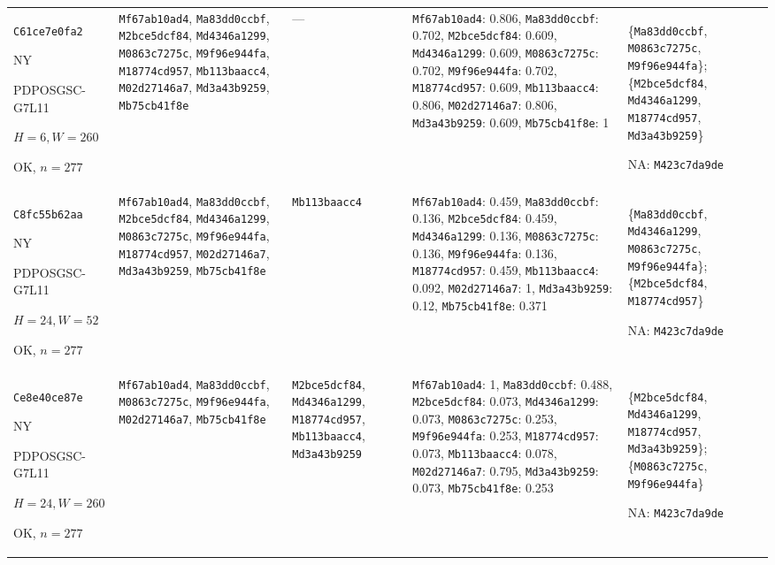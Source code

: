 \begin{longtable}{p{.15\linewidth}p{.17\linewidth}p{.17\linewidth}p{.25\linewidth}p{.14\linewidth}}
\texttt{C61ce7e0fa2}\par NY\par PDPOSGSC-\allowbreak{}G7L11\par $H=6,W=260$\par OK, $n=277$ & \texttt{Mf67ab10ad4}, \texttt{Ma83dd0ccbf}, \texttt{M2bce5dcf84}, \texttt{Md4346a1299}, \texttt{M0863c7275c}, \texttt{M9f96e944fa}, \texttt{M18774cd957}, \texttt{Mb113baacc4}, \texttt{M02d27146a7}, \texttt{Md3a43b9259}, \texttt{Mb75cb41f8e} & --- & \texttt{Mf67ab10ad4}: 0.806, \texttt{Ma83dd0ccbf}: 0.702, \texttt{M2bce5dcf84}: 0.609, \texttt{Md4346a1299}: 0.609, \texttt{M0863c7275c}: 0.702, \texttt{M9f96e944fa}: 0.702, \texttt{M18774cd957}: 0.609, \texttt{Mb113baacc4}: 0.806, \texttt{M02d27146a7}: 0.806, \texttt{Md3a43b9259}: 0.609, \texttt{Mb75cb41f8e}: 1 & \{\texttt{Ma83dd0ccbf}, \texttt{M0863c7275c}, \texttt{M9f96e944fa}\}; \{\texttt{M2bce5dcf84}, \texttt{Md4346a1299}, \texttt{M18774cd957}, \texttt{Md3a43b9259}\}\par NA: \texttt{M423c7da9de} \\
\texttt{C8fc55b62aa}\par NY\par PDPOSGSC-\allowbreak{}G7L11\par $H=24,W=52$\par OK, $n=277$ & \texttt{Mf67ab10ad4}, \texttt{Ma83dd0ccbf}, \texttt{M2bce5dcf84}, \texttt{Md4346a1299}, \texttt{M0863c7275c}, \texttt{M9f96e944fa}, \texttt{M18774cd957}, \texttt{M02d27146a7}, \texttt{Md3a43b9259}, \texttt{Mb75cb41f8e} & \texttt{Mb113baacc4} & \texttt{Mf67ab10ad4}: 0.459, \texttt{Ma83dd0ccbf}: 0.136, \texttt{M2bce5dcf84}: 0.459, \texttt{Md4346a1299}: 0.136, \texttt{M0863c7275c}: 0.136, \texttt{M9f96e944fa}: 0.136, \texttt{M18774cd957}: 0.459, \texttt{Mb113baacc4}: 0.092, \texttt{M02d27146a7}: 1, \texttt{Md3a43b9259}: 0.12, \texttt{Mb75cb41f8e}: 0.371 & \{\texttt{Ma83dd0ccbf}, \texttt{Md4346a1299}, \texttt{M0863c7275c}, \texttt{M9f96e944fa}\}; \{\texttt{M2bce5dcf84}, \texttt{M18774cd957}\}\par NA: \texttt{M423c7da9de} \\
\texttt{Ce8e40ce87e}\par NY\par PDPOSGSC-\allowbreak{}G7L11\par $H=24,W=260$\par OK, $n=277$ & \texttt{Mf67ab10ad4}, \texttt{Ma83dd0ccbf}, \texttt{M0863c7275c}, \texttt{M9f96e944fa}, \texttt{M02d27146a7}, \texttt{Mb75cb41f8e} & \texttt{M2bce5dcf84}, \texttt{Md4346a1299}, \texttt{M18774cd957}, \texttt{Mb113baacc4}, \texttt{Md3a43b9259} & \texttt{Mf67ab10ad4}: 1, \texttt{Ma83dd0ccbf}: 0.488, \texttt{M2bce5dcf84}: 0.073, \texttt{Md4346a1299}: 0.073, \texttt{M0863c7275c}: 0.253, \texttt{M9f96e944fa}: 0.253, \texttt{M18774cd957}: 0.073, \texttt{Mb113baacc4}: 0.078, \texttt{M02d27146a7}: 0.795, \texttt{Md3a43b9259}: 0.073, \texttt{Mb75cb41f8e}: 0.253 & \{\texttt{M2bce5dcf84}, \texttt{Md4346a1299}, \texttt{M18774cd957}, \texttt{Md3a43b9259}\}; \{\texttt{M0863c7275c}, \texttt{M9f96e944fa}\}\par NA: \texttt{M423c7da9de} \\

\end{longtable}
